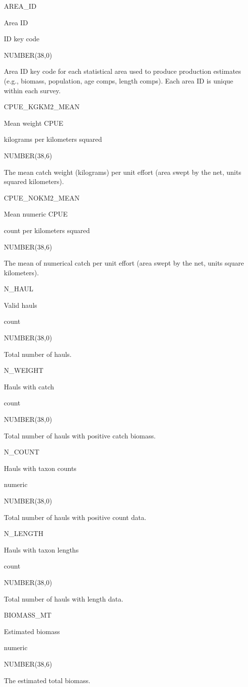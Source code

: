 \documentclass[
  letterpaper,
  oneside,
  open=any]{scrbook}
\begin{document}
AREA\_ID

Area ID

ID key code

NUMBER(38,0)

Area ID key code for each statistical area used to produce production
estimates (e.g., biomass, population, age comps, length comps). Each
area ID is unique within each survey.

CPUE\_KGKM2\_MEAN

Mean weight CPUE

kilograms per kilometers squared

NUMBER(38,6)

The mean catch weight (kilograms) per unit effort (area swept by the
net, units squared kilometers).

CPUE\_NOKM2\_MEAN

Mean numeric CPUE

count per kilometers squared

NUMBER(38,6)

The mean of numerical catch per unit effort (area swept by the net,
units square kilometers).

N\_HAUL

Valid hauls

count

NUMBER(38,0)

Total number of hauls.

N\_WEIGHT

Hauls with catch

count

NUMBER(38,0)

Total number of hauls with positive catch biomass.

N\_COUNT

Hauls with taxon counts

numeric

NUMBER(38,0)

Total number of hauls with positive count data.

N\_LENGTH

Hauls with taxon lengths

count

NUMBER(38,0)

Total number of hauls with length data.

BIOMASS\_MT

Estimated biomass

numeric

NUMBER(38,6)

The estimated total biomass.
\end{document}
